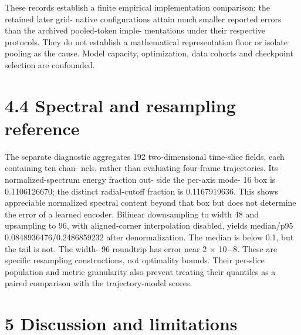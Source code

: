\documentclass[11pt]{article}
\begin{document}
These records establish a finite empirical implementation comparison: the retained later grid-
native configurations attain much smaller reported errors than the archived pooled-token imple-
mentations under their respective protocols. They do not establish a mathematical representation
floor or isolate pooling as the cause. Model capacity, optimization, data cohorts and checkpoint
selection are confounded.

\section*{4.4 Spectral and resampling reference}

The separate diagnostic aggregates 192 two-dimensional time-slice fields, each containing ten chan-
nels, rather than evaluating four-frame trajectories. Its normalized-spectrum energy fraction out-
side the per-axis mode- 16 box is 0.1106126670; the distinct radial-cutoff fraction is 0.1167919636.
This shows appreciable normalized spectral content beyond that box but does not determine the
error of a learned encoder.
Bilinear downsampling to width 48 and upsampling to 96, with aligned-corner interpolation
disabled, yields median/p95 0.0848936476/0.2486859232 after denormalization. The median is
below 0.1, but the tail is not. The width- 96 roundtrip has error near 2 \ensuremath{\times} 10\ensuremath{-}8. These are specific
resampling constructions, not optimality bounds. Their per-slice population and metric granularity
also prevent treating their quantiles as a paired comparison with the trajectory-model scores.

\section*{5 Discussion and limitations}
\end{document}
